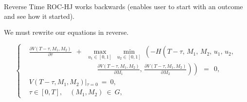 \documentclass{beamer}
\begin{document}
\begin{frame}{Reverse Time}
    ROC-HJ works backwards (enables user to start with an outcome and see how it started). \newline
    
    We must rewrite our equations in reverse.
    
    \begin{equation}
        \left\{ 
            \begin{aligned}
                & \frac{\partial V(T - \tau, M_1, M_2)}{\partial \tau}    \:\: + \:\:
                \max_{u_1 \in [0, 1]} \: \min_{u_2 \in [0, 1]} \:
                \left( -H \left( T - \tau, \, M_1, \, M_2, \, u_1, \, u_2, 
                {}^{{}^{{}^{{}^{{}^{}}}}} \right. \right. \\
                & \qquad\qquad\qquad\qquad\qquad
                \left. \left. \frac{\partial V(T - \tau, M_1, M_2)}{\partial M_1}, \,
                \frac{\partial V(T - \tau, M_1, M_2)}{\partial M_2}     \right) \right) \:\: =
                \:\: 0, \\
                & V(T - \tau, M_1, M_2) \left|_{\tau = 0} \right. \: = \: 0, \\
                & \tau \in [0, T], \quad (M_1, M_2) \: \in \: G,
            \end{aligned} 
        \right.  \label{75}
    \end{equation}
\end{frame}

\end{document}
